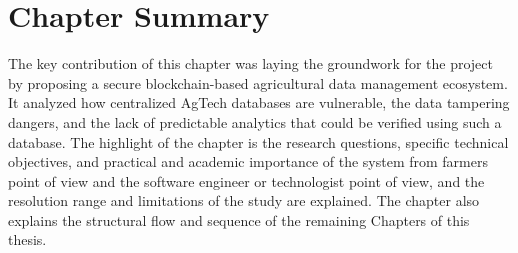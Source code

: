 \section{Chapter Summary}

The key contribution of this chapter was laying the groundwork for the project by proposing a secure blockchain-based agricultural data management ecosystem. It analyzed how centralized AgTech databases are vulnerable, the data tampering dangers, and the lack of predictable analytics that could be verified using such a database. The highlight of the chapter is the research questions, specific technical objectives, and practical and academic importance of the system from farmers point of view and the software engineer or technologist point of view, and the resolution range and limitations of the study are explained. The chapter also explains the structural flow and sequence of the remaining Chapters of this thesis.